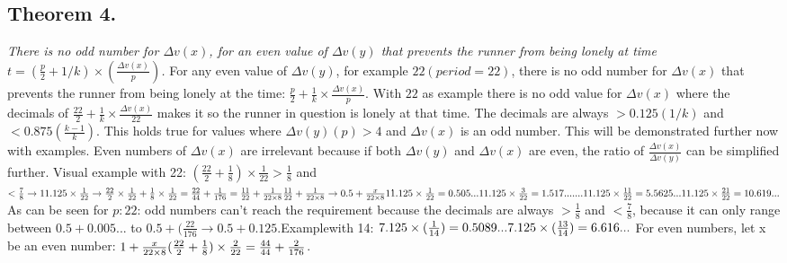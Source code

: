 \documentclass[12pt, a4paper]{article}
\begin{document}
\subsection*{Theorem 4.}\textit{There is no odd number for $\Delta v(x)$, for an even value of $\Delta v(y)$ that prevents the runner from being lonely at time $t = (\frac{p}{2}+1/k)\times (\frac{\Delta v(x)}{p})$.}
\newline
\newline
For any even value of $\Delta v(y)$, for example $22 (period = 22)$, there is no odd number for $\Delta v(x)$ that prevents the runner from being lonely at the time: $\frac{p}{2}+\frac{1}{k}\times\frac{\Delta v(x)}{p}$.
\newline
\newline
With $22$ as example there is no odd value for $\Delta v(x)$ where the decimals of $\frac{22}{2}+\frac{1}{k}\times\frac{\Delta v(x)}{22}$ makes it so the runner in question is lonely at that time. The decimals are always $> 0.125 (1/k)$ and $< 0.875 (\frac{k-1}{k})$. This holds true for values where $\Delta v(y) (p) > 4$ and $\Delta v(x)$ is an odd number. This will be demonstrated further now with examples. Even numbers of $\Delta v(x)$ are irrelevant because if both $\Delta v(y)$ and $\Delta v(x)$ are even, the ratio of $\frac{\Delta v(x)}{\Delta v(y)}$ can be simplified further.
\newline
\newline
Visual example with 22: \newline
$(\frac{22}{2} + \frac{1}{8})\times\frac{1}{22} > \frac{1}{8}$ and $<\frac{7}{8} \newline \rightarrow 11.125\times\frac{1}{22} \rightarrow \frac{22}{2}\times\frac{1}{22}+\frac{1}{8}\times\frac{1}{22} = \frac{22}{44}+\frac{1}{176} = \frac{11}{22}+\frac{1}{22\times8}\newline \newline \frac{11}{22}+\frac{1}{22\times8}\rightarrow 0.5 + \frac{x}{22\times8}\newline\newline 11.125\times\frac{1}{22} = 0.505... \newline 11.125\times\frac{3}{22} = 1.517... \newline .... \newline 11.125\times\frac{11}{22} = 5.5625 \newline ... \newline 11.125\times\frac{21}{22} = 10.619...$\newline As can be seen for $p:22$: odd numbers can't reach the requirement because the decimals are always $> \frac{1}{8}$ and $< \frac{7}{8}$, because it can only range between $0.5 + 0.005...$ to $0.5+(\frac{22}{176} \rightarrow 0.5 + 0.125$.\newline \newline Examplewith 14: \newline $7.125\times(\frac{1}{14}) = 0.5089... \newline 7.125\times(\frac{13}{14}) = 6.616...$
\newline
\newline
For even numbers, let x be an even number: $1 + \frac{x}{22\times8} \newline (\frac{22}{2} + \frac{1}{8})\times\frac{2}{22} = \frac{44}{44}+\frac{2}{176}$.
\end{document}
